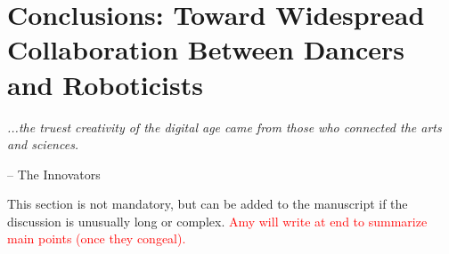 \documentclass[arts,article,submit,moreauthors,pdftex,10pt,a4paper]{mdpi}
\begin{document}
%
%
%

\section{Conclusions: Toward Widespread Collaboration Between Dancers and Roboticists}
\begin{center}
\textit{...the truest creativity of the digital age came from those who connected the arts and sciences.}
\end{center}
\begin{flushright}
-- The Innovators \cite{isaacson2014innovators}
\end{flushright}

This section is not mandatory, but can be added to the manuscript if the discussion is unusually long or complex. \textcolor{red}{Amy will write at end to summarize main points (once they congeal).}

\vspace{6pt} 

\end{document}
